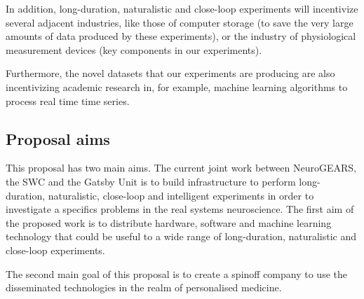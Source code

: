 In addition, long-duration, naturalistic and close-loop experiments will
incentivize several adjacent industries, like those of computer storage (to
save the very large amounts of data produced by these experiments), or the
industry of physiological measurement devices (key components in our
experiments).

Furthermore, the novel datasets that our experiments are producing are also
incentivizing academic research in, for example, machine learning algorithms to
process real time time series.

\subsection{Proposal aims}

This proposal has two main aims. The current joint work between NeuroGEARS, the
SWC and the Gatsby Unit is to build infrastructure to perform long-duration,
naturalistic, close-loop and intelligent experiments in order to investigate a
specifics problems in the real systems neuroscience. The first aim of the
proposed work is to distribute hardware, software and machine learning
technology that could be useful to a wide range of long-duration, naturalistic
and close-loop experiments.

The second main goal of this proposal is to create a spinoff company to use the
disseminated technologies in the realm of personalised medicine.

